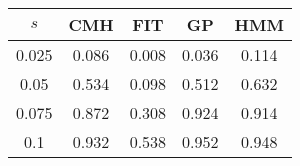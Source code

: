 \centering \begin{tabular}{c|c|c|c|c}
$s$	&CMH	&FIT	&GP	&HMM\\\hline
0.025	&0.086	&0.008	&0.036	&0.114\\
0.05	&0.534	&0.098	&0.512	&0.632\\
0.075	&0.872	&0.308	&0.924	&0.914\\
0.1	&0.932	&0.538	&0.952	&0.948\\
\end{tabular}
